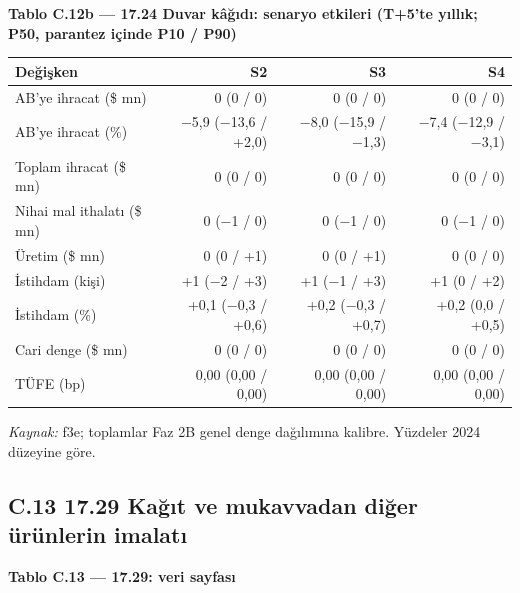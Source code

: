\endgroup


\textbf{Tablo C.12b --- 17.24 Duvar kâğıdı: senaryo etkileri (T+5'te yıllık; P50, parantez içinde P10 / P90)}

\nopagebreak[4]

\begingroup\gbtablo\small

\begin{longtable}[]{@{}lrrr@{}}
\toprule\noalign{}
\textbf{Değişken} & \textbf{S2} & \textbf{S3} & \textbf{S4} \\
\midrule\noalign{}
\endhead
\bottomrule\noalign{}
\endlastfoot
AB'ye ihracat (\$ mn) & 0 (0 / 0) & 0 (0 / 0) & 0 (0 / 0) \\
AB'ye ihracat (\%) & −5,9 (−13,6 / +2,0) & −8,0 (−15,9 / −1,3) & −7,4 (−12,9 / −3,1) \\
Toplam ihracat (\$ mn) & 0 (0 / 0) & 0 (0 / 0) & 0 (0 / 0) \\
Nihai mal ithalatı (\$ mn) & 0 (−1 / 0) & 0 (−1 / 0) & 0 (−1 / 0) \\
Üretim (\$ mn) & 0 (0 / +1) & 0 (0 / +1) & 0 (0 / 0) \\
İstihdam (kişi) & +1 (−2 / +3) & +1 (−1 / +3) & +1 (0 / +2) \\
İstihdam (\%) & +0,1 (−0,3 / +0,6) & +0,2 (−0,3 / +0,7) & +0,2 (0,0 / +0,5) \\
Cari denge (\$ mn) & 0 (0 / 0) & 0 (0 / 0) & 0 (0 / 0) \\
TÜFE (bp) & 0,00 (0,00 / 0,00) & 0,00 (0,00 / 0,00) & 0,00 (0,00 / 0,00) \\
\end{longtable}

\endgroup

\emph{Kaynak:} \etiketT{} f3e; toplamlar Faz 2B genel denge dağılımına kalibre. Yüzdeler 2024 düzeyine göre.

\hypertarget{nace_kartlar_16-18-c13-1729-kaux11fux131t-ve-mukavvadan-diux11fer-uxfcruxfcnlerin-imalatux131}{%
\subsection{C.13 17.29 Kağıt ve mukavvadan diğer ürünlerin imalatı}\label{nace_kartlar_16-18-c13-1729-kaux11fux131t-ve-mukavvadan-diux11fer-uxfcruxfcnlerin-imalatux131}}


\textbf{Tablo C.13 --- 17.29: veri sayfası}

\nopagebreak[4]

